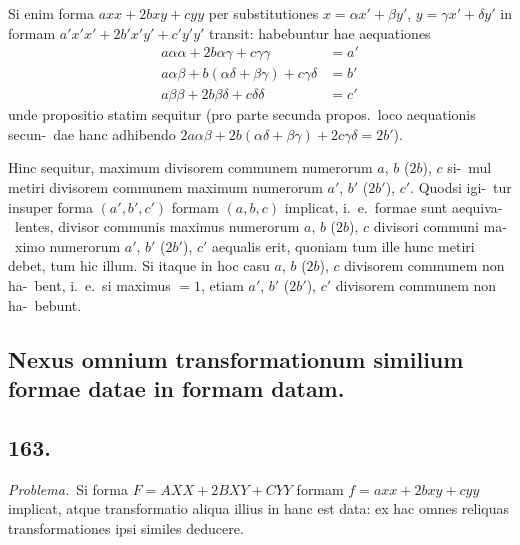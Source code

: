 \documentclass[12pt,a4paper]{article}
\theoremstyle{plain}
\theoremstyle{definition}
\theoremstyle{remark}
\begin{document}
Si enim forma $axx + 2bxy + cyy$ per substitutiones $x = \alpha x' + \beta y'$,
$y = \gamma x' + \delta y'$ in formam $a'x'x' + 2b'x'y' + c'y'y'$ transit: habebuntur hae
aequationes
\begin{align*}
a\alpha\alpha + 2b\alpha\gamma + c\gamma\gamma &= a' \\
a\alpha\beta + b(\alpha\delta + \beta\gamma) + c\gamma\delta &= b' \\
a\beta\beta + 2b\beta\delta + c\delta\delta &= c'
\end{align*}
unde propositio statim sequitur (pro parte secunda propos.\ loco aequationis secun-\ dae hanc adhibendo $2a\alpha\beta + 2b(\alpha\delta + \beta\gamma) + 2c\gamma\delta = 2b'$).

Hinc sequitur, maximum divisorem communem numerorum $a$, $b$ ($2b$), $c$ si-\ mul metiri divisorem communem maximum numerorum $a'$, $b'$ ($2b'$), $c'$. Quodsi igi-\ tur insuper forma $(a', b', c')$ formam $(a, b, c)$ implicat, i.~e.\ formae sunt aequiva-\ lentes, divisor communis maximus numerorum $a$, $b$ ($2b$), $c$ divisori communi ma-\ ximo numerorum $a'$, $b'$ ($2b'$), $c'$ aequalis erit, quoniam tum ille hunc metiri debet,
tum hic illum. Si itaque in hoc casu $a$, $b$ ($2b$), $c$ divisorem communem non ha-\ bent, i.~e.\ si maximus $= 1$, etiam $a'$, $b'$ ($2b'$), $c'$ divisorem communem non ha-\ bebunt.

\subsection*{Nexus omnium transformationum similium formae datae in formam datam.}

\subsection*{163.}

\emph{Problema.}\ Si forma $F = AXX + 2BXY + CYY$
formam $f = ax x + 2bxy + cyy$
implicat, atque transformatio aliqua illius in hanc est data: ex hac omnes reliquas
transformationes ipsi similes deducere.
\end{document}
